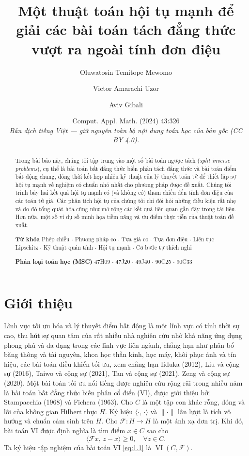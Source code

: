 \documentclass[11pt,a4paper]{article}
\title{\vspace{-1.2cm}\bfseries Một thuật toán hội tụ mạnh để giải các bài toán tách đẳng thức vượt ra ngoài tính đơn điệu}
\author{Oluwatosin Temitope Mewomo \and Victor Amarachi Uzor \and Aviv Gibali}
\date{\small Comput. Appl. Math. (2024) 43:326\\[2pt]
\textit{Bản dịch tiếng Việt --- giữ nguyên toàn bộ nội dung toán học của bản gốc (CC BY 4.0).}}
\theoremstyle{plain}
\theoremstyle{definition}
\theoremstyle{remark}
\numberwithin{equation}{section}
\newcommand{\Fc}{\mathcal{F}}
\newcommand{\inp}[2]{\langle #1,\,#2\rangle}
\newcommand{\nm}[1]{\lVert #1\rVert}
\DeclareMathOperator{\VI}{VI}
\begin{document}
\maketitle

\begin{abstract}
\noindent Trong bài báo này, chúng tôi tập trung vào một số bài toán ngược tách (\textit{split inverse problems}), cụ thể là bài toán bất đẳng thức biến phân tách đẳng thức và bài toán điểm bất động chung, đồng thời kết hợp nhiều kỹ thuật của lý thuyết toán tử để thiết lập sự hội tụ mạnh về nghiệm có chuẩn nhỏ nhất cho phương pháp được đề xuất. Chúng tôi trình bày hai kết quả hội tụ mạnh có (và không có) tham chiếu đến tính đơn điệu của các toán tử giá. Các phân tích hội tụ của chúng tôi chỉ đòi hỏi những điều kiện rất nhẹ và do đó tổng quát hóa cũng như mở rộng các kết quả liên quan gần đây trong tài liệu. Hơn nữa, một số ví dụ số minh họa tiềm năng và ưu điểm thực tiễn của thuật toán đề xuất.

\medskip
\noindent\textbf{Từ khóa} Phép chiếu $\cdot$ Phương pháp co $\cdot$ Tựa giả co $\cdot$ Tựa đơn điệu $\cdot$ Liên tục Lipschitz $\cdot$ Kỹ thuật quán tính $\cdot$ Hội tụ mạnh $\cdot$ Cỡ bước tự thích nghi

\medskip
\noindent\textbf{Phân loại toán học (MSC)} 47H09 $\cdot$ 47J20 $\cdot$ 49J40 $\cdot$ 90C25 $\cdot$ 90C33
\end{abstract}

\section{Giới thiệu}

Lĩnh vực tối ưu hóa và lý thuyết điểm bất động là một lĩnh vực có tính thời sự cao, thu hút sự quan tâm của rất nhiều nhà nghiên cứu nhờ khả năng ứng dụng phong phú và đa dạng trong các lĩnh vực liên ngành, chẳng hạn như phân bổ băng thông và tài nguyên, khoa học thần kinh, học máy, khôi phục ảnh và tín hiệu, các bài toán điều khiển tối ưu, xem chẳng hạn Iiduka (2012), Liu và cộng sự (2016), Taiwo và cộng sự (2021), Tan và cộng sự (2021), Zeng và cộng sự (2020). Một bài toán tối ưu nổi tiếng được nghiên cứu rộng rãi trong nhiều năm là bài toán bất đẳng thức biến phân cổ điển (VI), được giới thiệu bởi Stampacchia (1968) và Fichera (1963). Cho $C$ là một tập con khác rỗng, đóng và lồi của không gian Hilbert thực $H$. Ký hiệu $\inp{\cdot}{\cdot}$ và $\nm{\cdot}$ lần lượt là tích vô hướng và chuẩn cảm sinh trên $H$. Cho $\Fc:H\to H$ là một ánh xạ đơn trị. Khi đó, bài toán VI được định nghĩa là tìm điểm $x\in C$ sao cho
\begin{equation}
\inp{\Fc x}{z-x}\ge 0,\quad \forall z\in C. \label{eq:1.1}
\end{equation}
Ta ký hiệu tập nghiệm của bài toán VI \eqref{eq:1.1} là $\VI(C,\Fc)$.
\end{document}
